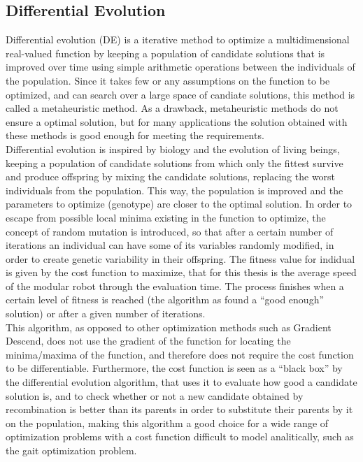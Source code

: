 \subsection{Differential Evolution}
\label{evolution_DE}
Differential evolution (DE) is a iterative method to optimize a multidimensional real-valued function by keeping a population of candidate solutions that is improved over time using simple arithmetic operations between the individuals of the population. Since it takes few or any assumptions on the function to be optimized, and can search over a large space of candiate solutions, this method is called a metaheuristic method. As a drawback, metaheuristic methods do not ensure a optimal solution, but for many applications the solution obtained with these methods is good enough for meeting the requirements.\\

Differential evolution is inspired by biology and the evolution of living beings, keeping a population of candidate solutions from which only the fittest survive and produce offspring by mixing the candidate solutions, replacing the worst individuals from the population. This way, the population is improved and the parameters to optimize (genotype) are closer to the optimal solution. In order to escape from possible local minima existing in the function to optimize, the concept of random mutation is introduced, so that after a certain number of iterations an individual can have some of its variables randomly modified, in order to create genetic variability in their offspring. The fitness value for indidual is given by the cost function to maximize, that for this thesis is the average speed of the modular robot through the evaluation time. The process finishes when a certain level of fitness is reached (the algorithm as found a ``good enough'' solution) or after a given number of iterations.\\

This algorithm, as opposed to other optimization methods such as Gradient Descend, does not use the gradient of the function for locating the minima/maxima of the function, and therefore does not require the cost function to be differentiable. Furthermore, the cost function is seen as a ``black box'' by the differential evolution algorithm, that uses it to evaluate how good a candidate solution is, and to check whether or not a new candidate obtained by recombination is better than its parents in order to substitute their parents by it on the population, making this algorithm a good choice for a wide range of optimization problems with a cost function difficult to model analitically, such as the gait optimization problem.\\

